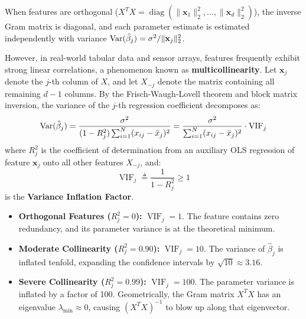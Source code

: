When features are orthogonal ($X^T X = \operatorname{diag}(\|\mathbf{x}_1\|_2^2, \dots, \|\mathbf{x}_d\|_2^2)$), the inverse Gram matrix is diagonal, and each parameter estimate is estimated independently with variance $\operatorname{Var}(\hat{\beta}_j) = \sigma^2 / \|\mathbf{x}_j\|_2^2$.

However, in real-world tabular data and sensor arrays, features frequently exhibit strong linear correlations, a phenomenon known as \textbf{multicollinearity}. 
Let $\mathbf{x}_j$ denote the $j$-th column of $X$, and let $X_{-j}$ denote the matrix containing all remaining $d-1$ columns. By the Frisch-Waugh-Lovell theorem and block matrix inversion, the variance of the $j$-th regression coefficient decomposes as:
\begin{equation}
\operatorname{Var}(\hat{\beta}_j) = \frac{\sigma^2}{(1 - R_j^2) \sum_{i=1}^N (x_{ij} - \bar{x}_j)^2} = \frac{\sigma^2}{\sum_{i=1}^N (x_{ij} - \bar{x}_j)^2} \cdot \operatorname{VIF}_j
\label{eq:vif_formula}
\end{equation}
where $R_j^2$ is the coefficient of determination from an auxiliary OLS regression of feature $\mathbf{x}_j$ onto all other features $X_{-j}$, and:
\begin{equation}
\operatorname{VIF}_j \triangleq \frac{1}{1 - R_j^2} \ge 1
\end{equation}
is the \textbf{Variance Inflation Factor}.

\begin{itemize}
    \item \textbf{Orthogonal Features ($R_j^2 = 0$):} $\operatorname{VIF}_j = 1$. The feature contains zero redundancy, and its parameter variance is at the theoretical minimum.
    \item \textbf{Moderate Collinearity ($R_j^2 = 0.90$):} $\operatorname{VIF}_j = 10$. The variance of $\hat{\beta}_j$ is inflated tenfold, expanding the confidence intervals by $\sqrt{10} \approx 3.16$.
    \item \textbf{Severe Collinearity ($R_j^2 = 0.99$):} $\operatorname{VIF}_j = 100$. The parameter variance is inflated by a factor of 100. Geometrically, the Gram matrix $X^T X$ has an eigenvalue $\lambda_{\min} \approx 0$, causing $(X^T X)^{-1}$ to blow up along that eigenvector.
\end{itemize}


